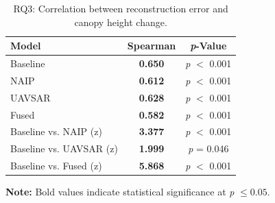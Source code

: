 \documentclass[remotesensing,article,accept,pdftex,moreauthors]{Definitions/mdpi}
\renewcommand{\hl}[1]{#1}
\begin{document}
\begin{table}[H]

\caption{RQ3: Correlation between reconstruction error and canopy height change.}
\begin{tabularx}{\textwidth}{lCC} %
\toprule
\textbf{Model} & \textbf{Spearman \boldmath{$\rho$}} & \textbf{\textit{p}-Value} \\
\midrule
Baseline & \textbf{\hl{0.650} %
} & \emph{p} $<$ 0.001 \\
NAIP & \textbf{0.612} & \emph{p} $<$ 0.001 \\
UAVSAR & \textbf{0.628} & \emph{p} $<$ 0.001 \\
Fused & \textbf{0.582} & \emph{p} $<$ 0.001 \\
\midrule
Baseline vs. NAIP (z) & \textbf{3.377} & \emph{p} $<$ 0.001 \\
Baseline vs. UAVSAR (z) & \textbf{1.999} & \emph{p} = 0.046 \\
Baseline vs. Fused (z) & \textbf{5.868} & \emph{p} $<$ 0.001 \\
\bottomrule
\end{tabularx}
\label{tab:rq3_results}
\footnotesize\textbf{Note:} Bold values indicate statistical significance at \emph{p} $\leq 0.05$.
\end{table}
\vspace{-10pt}
\end{document}
